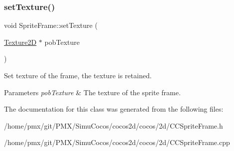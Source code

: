 \subsubsection{\texorpdfstring{set\+Texture()}{setTexture()}\hspace{0.1cm}{\footnotesize\ttfamily [2/2]}}
{\footnotesize\ttfamily void Sprite\+Frame\+::set\+Texture (\begin{DoxyParamCaption}\item[{\hyperlink{classTexture2D}{Texture2D} $\ast$}]{pob\+Texture }\end{DoxyParamCaption})}

Set texture of the frame, the texture is retained.


\begin{DoxyParams}{Parameters}
{\em pob\+Texture} & The texture of the sprite frame. \\
\hline
\end{DoxyParams}


The documentation for this class was generated from the following files\+:\begin{DoxyCompactItemize}
\item 
/home/pmx/git/\+P\+M\+X/\+Simu\+Cocos/cocos2d/cocos/2d/C\+C\+Sprite\+Frame.\+h\item 
/home/pmx/git/\+P\+M\+X/\+Simu\+Cocos/cocos2d/cocos/2d/C\+C\+Sprite\+Frame.\+cpp\end{DoxyCompactItemize}
